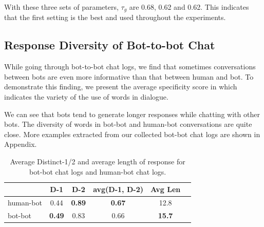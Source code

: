 With these three sets of parameters, 
 $\tau_g$ are 0.68, 0.62 and 0.62.
This indicates that the first setting is the best and used throughout
the experiments. 



\subsection{Response Diversity of Bot-to-bot Chat}
\label{sec:diversity}
While going through bot-to-bot chat logs, 
we find that sometimes 
conversations between bots 
are even more informative than that between human and bot. 
To demonstrate this finding, 
we present the average specificity score
in  which indicates the variety of the use of words
in dialogue.  

We can see that bots tend to generate longer 
responses while chatting with other bots. 
The diversity of words in bot-bot and human-bot conversations
 are quite close.
More examples extracted from our collected
bot-bot chat logs are shown in Appendix.    

\begin{table}[th]
\scriptsize
\centering
\begin{tabular}{lccccc}
\toprule
& D-1 & D-2 & avg(D-1, D-2)&Avg Len\\ \midrule
human-bot & 0.44  & \textbf{0.89}   &\textbf{0.67}  &12.8 \\ \midrule
bot-bot & \textbf{0.49}  &0.83    &0.66 &\textbf{15.7} \\ \bottomrule
\end{tabular}
\caption{Average Distinct-1/2 and average length of response for bot-bot chat logs and human-bot chat logs. }
\label{tab:div}
\end{table}


